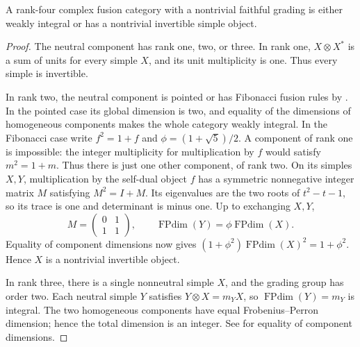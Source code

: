 \begin{lemma}\label{col:lem:rank-four-grading}
A rank-four complex fusion category with a nontrivial faithful
grading is either weakly integral or has a nontrivial invertible
simple object.
\end{lemma}
\begin{proof}
The neutral component has rank one, two, or three. In rank one,
$X\otimes X^*$ is a sum of units for every simple $X$, and its
unit multiplicity is one. Thus every simple is invertible.

In rank two, the neutral component is pointed or has Fibonacci
fusion rules by \cite{OstrikRankTwo}. In the pointed case its global
dimension is two, and equality of the dimensions of homogeneous
components makes the whole category weakly integral. In the
Fibonacci case write $f^2=1+f$ and
$\phi=(1+\sqrt5)/2$. A component of rank one is impossible:
the integer multiplicity for multiplication by $f$ would satisfy
$m^2=1+m$. Thus there is just one other component, of rank two.
On its simples $X,Y$, multiplication by the self-dual object $f$
has a symmetric nonnegative integer matrix $M$ satisfying
$M^2=I+M$. Its eigenvalues are the two roots of $t^2-t-1$,
so its trace is one and determinant is minus one. Up to exchanging
$X,Y$,
\[
 M=\begin{pmatrix}0&1\\1&1\end{pmatrix},\qquad
 \operatorname{FPdim}(Y)=\phi\operatorname{FPdim}(X).
\]
Equality of component dimensions now gives
$(1+\phi^2)\operatorname{FPdim}(X)^2=1+\phi^2$.
Hence $X$ is a nontrivial invertible object.

In rank three, there is a single nonneutral simple $X$, and the
grading group has order two. Each neutral simple $Y$ satisfies
$Y\otimes X=m_YX$, so $\operatorname{FPdim}(Y)=m_Y$ is integral.
The two homogeneous components have equal Frobenius--Perron
dimension; hence the total dimension is an integer. See
\cite[Proposition~8.20]{ENO} for equality of component dimensions.
\end{proof}

